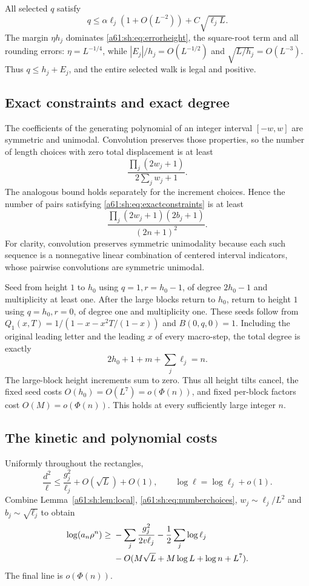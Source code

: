 \documentclass[11pt,letterpaper]{article}
\numberwithin{equation}{section}
\theoremstyle{remark}\newtheorem{remark}[theorem]{Remark}
\begin{document}
All selected $q$ satisfy
\[
 q\le\alpha\ell_j(1+O(L^{-2}))+C\sqrt{\ell_jL}.
\]
The margin $\eta h_j$ dominates \eqref{a61:sh:eq:errorheight}, the square-root term and all rounding errors: $\eta=L^{-1/4}$, while $|E_j|/h_j=O(L^{-1/2})$ and $\sqrt{L/h_j}=O(L^{-3})$. Thus $q\le h_j+E_j$, and the entire selected walk is legal and positive.

\subsection{Exact constraints and exact degree}
The coefficients of the generating polynomial of an integer interval $[-w,w]$ are symmetric and unimodal. Convolution preserves those properties, so the number of length choices with zero total displacement is at least
\[
 \frac{\prod_j(2w_j+1)}{2\sum_jw_j+1}.
\]
The analogous bound holds separately for the increment choices. Hence the number of pairs satisfying \eqref{a61:sh:eq:exactconstraints} is at least
\begin{equation}\label{a61:sh:eq:numberchoices}
 \frac{\prod_j(2w_j+1)(2b_j+1)}{(2n+1)^2}.
\end{equation}
For clarity, convolution preserves symmetric unimodality because each such sequence is a nonnegative linear combination of centered interval indicators, whose pairwise convolutions are symmetric unimodal.

Seed from height $1$ to $h_0$ using $q=1,r=h_0-1$, of degree $2h_0-1$ and multiplicity at least one. After the large blocks return to $h_0$, return to height $1$ using $q=h_0,r=0$, of degree one and multiplicity one. These seeds follow from $Q_1(x,T)=1/(1-x-x^2T/(1-x))$ and $B(0,q,0)=1$. Including the original leading letter and the leading $x$ of every macro-step, the total degree is exactly
\[
 2h_0+1+m+\sum_j\ell_j=n.
\]
The large-block height increments sum to zero. Thus all height tilts cancel, the fixed seed costs $O(h_0)=O(L^7)=o(\Phi(n))$, and fixed per-block factors cost $O(M)=o(\Phi(n))$. This holds at every sufficiently large integer $n$.

\subsection{The kinetic and polynomial costs}
Uniformly throughout the rectangles,
\[
 \frac{d^2}{\ell}\le\frac{g_j^2}{\ell_j}+O(\sqrt L)+O(1),
 \qquad \log\ell=\log\ell_j+o(1).
\]
Combine Lemma~\ref{a61:sh:lem:local}, \eqref{a61:sh:eq:numberchoices}, $w_j\sim\ell_j/L^2$ and $b_j\sim\sqrt{\ell_j}$ to obtain
\begin{align}\label{a61:sh:eq:lowercost}
 \log(a_n\rho^n)\ge{}&-\sum_j\frac{g_j^2}{2v\ell_j}
 -\frac12\sum_j\log\ell_j\notag\\
 &-O(M\sqrt L+M\log L+\log n+L^7).
\end{align}
The final line is $o(\Phi(n))$.
\end{document}
